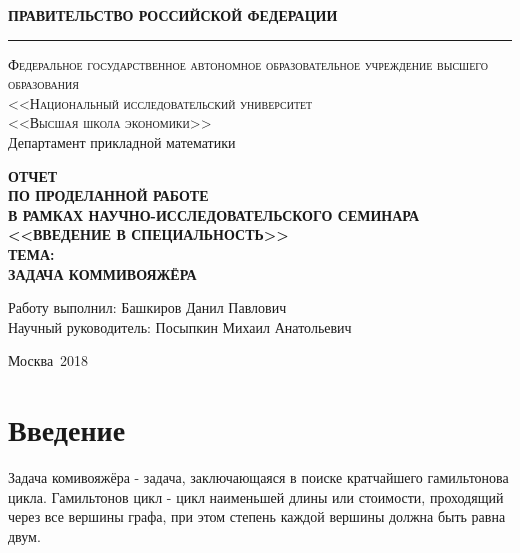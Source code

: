 \documentclass[a4paper, 12pt] {article}
\begin{document}
\begin{titlepage}
\begin{center}
{\textsc{\textbf{ПРАВИТЕЛЬСТВО РОССИЙСКОЙ ФЕДЕРАЦИИ}}}\\
\vspace{0.5cm}
\hrule
\vspace{0.5cm}
{\textsc{Федеральное государственное автономное образовательное учреждение высшего образования \\ <<Национальный исследовательский университет \\ <<Высшая школа экономики>>}}\\
\vspace{1cm}
Департамент прикладной математики
\end{center}

\vspace{\fill}

\begin{center}
{\Large{\textbf{ОТЧЕТ\\}}}
{\Large{\textbf{ПО ПРОДЕЛАННОЙ РАБОТЕ\\}}}
{\Large{\textbf{В РАМКАХ НАУЧНО-ИССЛЕДОВАТЕЛЬСКОГО СЕМИНАРА\\}}}
{\Large{\textbf{<<ВВЕДЕНИЕ В СПЕЦИАЛЬНОСТЬ>>\\}}}
\vspace{2em}
{\large{\textbf{ТЕМА:\\ ЗАДАЧА КОММИВОЯЖЁРА}}}
\end{center}

\vspace{\fill}


\begin{flushright}
Работу выполнил: Башкиров Данил Павлович\\
Научный руководитель: Посыпкин Михаил Анатольевич
\end{flushright}

\vspace{\fill}

\begin{center}
Москва~2018
\end{center}
\end{titlepage}
\pagestyle{fancy}
\section*{Введение}
Задача комивояжёра - задача, заключающаяся в поиске кратчайшего гамильтонова цикла. Гамильтонов цикл - цикл наименьшей длины или стоимости, проходящий через все вершины графа, при этом степень каждой вершины должна быть равна двум. \\
\end{document}
